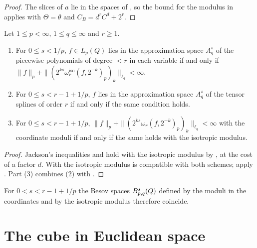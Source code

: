 \begin{proof}
\leanok
The slices of $a$ lie in the spaces of , so the bound for the modulus in
 applies with $\Theta = \theta$ and $C_B = d^r C^d + 2^r$.
\end{proof}

\begin{theorem}
\label{thm:iso-besov}
\leanok
{}
Let $1 \leq p < \infty$, $1 \leq q \leq \infty$ and $r \geq 1$.
\begin{enumerate}
  \item For $0 \leq s < 1/p$, $f \in L_p(Q)$ lies in the approximation space $A^s_q$ of the
    piecewise polynomials of degree $< r$ in each variable if and only if
    $\|f\|_p + \| ( 2^{ks} \omega^{\mathrm{iso}}_r(f, 2^{-k})_p )_k \|_{\ell_q} < \infty$.
  \item For $0 \leq s < r - 1 + 1/p$, $f$ lies in the approximation space $A^s_q$ of the tensor
    splines of order $r$ if and only if the same condition holds.
  \item For $0 \leq s < r - 1 + 1/p$,
    $\|f\|_p + \| ( 2^{ks} \omega_r(f, 2^{-k})_p )_k \|_{\ell_q} < \infty$ with the coordinate
    moduli if and only if the same holds with the isotropic modulus.
\end{enumerate}
\end{theorem}

\begin{proof}
\leanok
Jackson's inequalities  and  hold with the
isotropic modulus by , at the cost of a factor $d$. With
 the isotropic modulus is compatible with both schemes; apply
. Part (3) combines (2) with .
\end{proof}

For $0 < s < r - 1 + 1/p$ the Besov spaces $B^{s}_{p,q}(Q)$ defined by the moduli in the
coordinates and by the isotropic modulus therefore coincide.

\section{The cube in Euclidean space}
\label{sec:cube-euclidean}

